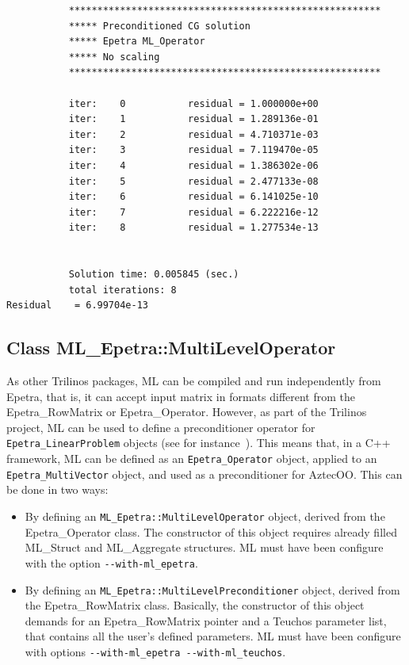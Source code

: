 \begin{verbatim}
           *******************************************************
           ***** Preconditioned CG solution
           ***** Epetra ML_Operator
           ***** No scaling
           *******************************************************

           iter:    0           residual = 1.000000e+00
           iter:    1           residual = 1.289136e-01
           iter:    2           residual = 4.710371e-03
           iter:    3           residual = 7.119470e-05
           iter:    4           residual = 1.386302e-06
           iter:    5           residual = 2.477133e-08
           iter:    6           residual = 6.141025e-10
           iter:    7           residual = 6.222216e-12
           iter:    8           residual = 1.277534e-13


           Solution time: 0.005845 (sec.)
           total iterations: 8
Residual    = 6.99704e-13
\end{verbatim}


\subsection{Class ML\_Epetra::MultiLevelOperator}
\label{sec:ml:operator}

As other Trilinos packages, ML can be compiled and run independently
from Epetra, that is, it can accept input matrix in formats different
from the Epetra\_RowMatrix or Epetra\_Operator. However, as part of the
Trilinos project, ML can be used to define a preconditioner operator for
\verb!Epetra_LinearProblem! objects (see for
instance~\cite{Epetra-Ref-Guide}). This means that, in a C++ framework,
ML can be defined as an \verb!Epetra_Operator! object, applied to an
\verb!Epetra_MultiVector!  object, and used as a preconditioner for
AztecOO.  This can be done in two ways:
\begin{itemize}
\item By defining an \verb!ML_Epetra::MultiLevelOperator! object, derived from the
  Epetra\_Operator class. The constructor of this object requires
  already filled ML\_Struct and ML\_Aggregate structures.  ML must have
  been configure with the option \newline \verb!--with-ml_epetra!.
\item By defining an \verb!ML_Epetra::MultiLevelPreconditioner! object, derived
  from the Epetra\_RowMatrix class. Basically, the constructor of
  this object demands for an Epetra\_RowMatrix  pointer and a
  Teuchos parameter list, that contains all the user's defined
  parameters. ML must have been configure with options \newline
  \verb!--with-ml_epetra --with-ml_teuchos!.
\end{itemize}


